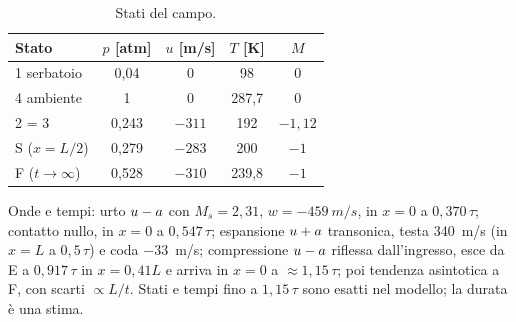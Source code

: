 \begin{table}[H]
  \centering
  \small
  \begin{tabular}{lcccc}
    \toprule
    Stato & $p$ [atm] & $u$ [m/s] & $T$ [K] & $M$ \\
    \midrule
    1 serbatoio & 0,04 & 0 & 98 & 0 \\
    4 ambiente & 1 & 0 & 287,7 & 0 \\
    2 = 3 & 0,243 & $-311$ & 192 & $-1{,}12$ \\
    S ($x=L/2$) & 0,279 & $-283$ & 200 & $-1$ \\
    F ($t\to\infty$) & 0,528 & $-310$ & 239,8 & $-1$ \\
    \bottomrule
  \end{tabular}
  \caption{Stati del campo.}
\end{table}
Onde e tempi: urto $u-a$ con $M_s=2{,}31$, $w=\SI{-459}{m/s}$, in $x=0$ a $0{,}370\,\tau$; contatto nullo, in $x=0$ a
$0{,}547\,\tau$; espansione $u+a$ transonica, testa \SI{340}{m/s} (in $x=L$ a $0{,}5\,\tau$) e coda \SI{-33}{m/s};
compressione $u-a$ riflessa dall'ingresso, esce da E a $0{,}917\,\tau$ in $x=0{,}41L$ e arriva in $x=0$ a
$\approx1{,}15\,\tau$; poi tendenza asintotica a F, con scarti $\propto L/t$. Stati e tempi fino a $1{,}15\,\tau$ sono
esatti nel modello; la durata è una stima.

